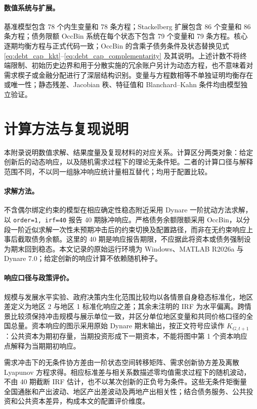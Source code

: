 \documentclass[12pt,UTF8]{ctexart}
\begin{document}
	\paragraph{数值系统与扩展。}
	基准模型包含 78 个内生变量和 78 条方程；Stackelberg 扩展包含 86 个变量和 86 条方程；债务限额 OccBin 系统在每个状态下包含 79 个变量和 79 条方程。核心逐期均衡方程与正式代码一致；OccBin 的含乘子债务条件及状态替换见式 \eqref{eq:debt_cap_kkt}--\eqref{eq:debt_cap_complementarity} 及其说明。上述计数不将终端限制、初始历史边界和用于分散实施的冗余账户另计为动态方程，也不意味着对需求楔子或金融分配进行了深层结构识别。变量与方程数相等不单独证明均衡存在或唯一性；静态残差、Jacobian 秩、特征值和 Blanchard--Kahn 条件均由模型独立验证。
	
	\section{计算方法与复现说明}
	\label{app:computation}
	
	本附录说明数值求解、结果度量及复现材料的对应关系。计算区分两类对象：给定创新后的动态响应，以及随机需求过程下的理论无条件矩。二者的计算口径与解释范围不同，不以同一组脉冲响应统计量相互替代；均用于配置比较。
	
	\paragraph{求解方法。}
	不含偶尔绑定约束的模型在相应确定性稳态附近采用 Dynare 一阶扰动方法求解，以 \nolinkurl{order=1, irf=40} 报告 40 期脉冲响应。严格债务余额限额采用 OccBin，以分段一阶近似求解一次性未预期冲击后的约束切换及配置路径，而非在无约束响应上事后截取债务余额。这里的 40 期是响应报告期限，不应据此将资本或债务强制设为期末回到稳态。本文记录的原始运行环境为 Windows、MATLAB R2026a 与 Dynare 7.0；给定创新的响应计算不依赖随机种子。
	
	\paragraph{响应口径与政策评价。}
	规模与发展水平实验、政府决策内生化范围比较均以各情景自身稳态标准化，地区差定义为地区 2 与地区 1 标准化响应之差；其余未注明的 IRF 为水平偏离。跨情景比较须保持冲击规模与展示单位一致，并区分单位地区变量和共同价格口径的全国总量。资本响应的图示采用原始 Dynare 期末输出，按正文符号应读作 $K_{G,t+1}$：公共资本为期初存量，当期投资形成下一期资本，不能将图中第 1 个资本响应点解释为当期期初响应。
	
	需求冲击下的无条件协方差由一阶状态空间转移矩阵、需求创新协方差及离散 Lyapunov 方程求得。相应标准差与相关系数描述零均值需求过程下的随机波动，不由 40 期截断 IRF 估计，也不以某次创新的正负号为条件。这些无条件矩衡量全国通胀和产出波动、地区产出差波动及两地产出相关性；结合债务服务、公共投资和公共资本差异，构成本文的配置评价维度。
	
\end{document}
